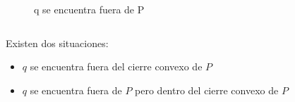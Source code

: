 \documentclass[aspectratio=169,xcolor=dvipsnames, t]{beamer}
\begin{document}
\begin{frame}
\begin{columns}
\begin{column}{0.45\textwidth}
\begin{figure}
          \caption{q se encuentra fuera de P}
        \end{figure}
      \end{column}
    \end{columns}
\end{frame}


\begin{frame}[c]
    Existen dos situaciones:
    \begin{itemize}
        \item $q$ se encuentra fuera del cierre convexo de  $P$
        \item $q$ se encuentra fuera de $P$ pero dentro del cierre convexo de $P$
    \end{itemize}
\end{frame}
\end{document}
